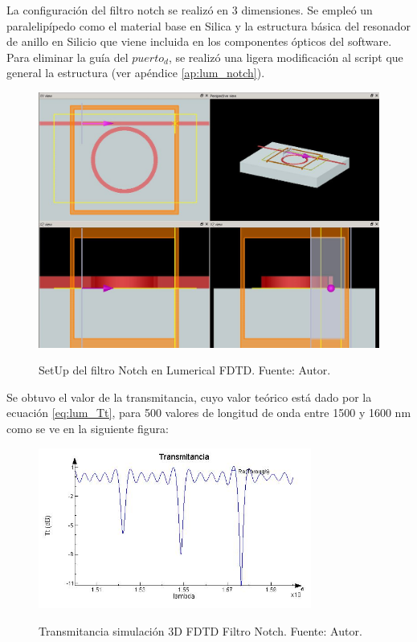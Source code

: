 La configuración del filtro notch se realizó en 3 dimensiones. Se empleó un paralelipípedo
como el material base en Silica y la estructura básica del resonador de anillo en
Silicio que viene incluida en los componentes ópticos del software.
Para eliminar la guía del $puerto_d$, se realizó una ligera modificación
al script que general la estructura (ver apéndice \ref{ap:lum_notch}).

\begin{figure}[H]
\caption{SetUp del filtro Notch en Lumerical FDTD. Fuente: Autor.}
\centering
\includegraphics[width=1.0\textwidth,natwidth=1066,natheight=799]{figs/lum_setup_n.jpg}
\label{fig:lum_setup_n}
\end{figure} 

Se obtuvo el valor de la transmitancia, cuyo valor teórico está dado por la 
ecuación \ref{eq:lum_Tt}, para 500 valores de longitud de onda entre 1500 y
1600 nm como se ve en la siguiente figura:

\begin{figure}[H]
\caption{Transmitancia simulación 3D FDTD Filtro Notch. Fuente: Autor.}
\centering
\includegraphics[width=0.8\textwidth,natwidth=605,natheight=356]{figs/lum_t_n.jpg}
\label{fig:lum_t_fdtd_n}
\end{figure} 


